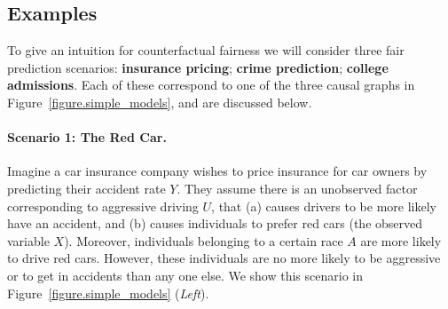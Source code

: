 \subsection{Examples}
To give an intuition for counterfactual fairness we will consider three %
fair prediction scenarios: \textbf{insurance pricing}; \textbf{crime prediction}; \textbf{college admissions}. Each of these correspond to one of the three causal graphs in Figure~\ref{figure.simple_models}, and are discussed below.
%
\paragraph{Scenario 1: The Red Car.}
Imagine a car insurance company wishes to price insurance for car owners by
predicting their accident rate $Y$. They assume there is an
unobserved factor corresponding to aggressive driving $U$, that (a) causes
drivers to be more likely have an accident, and (b) causes individuals to prefer red cars (the observed
variable $X$). Moreover, individuals belonging to a
certain race $A$ are more likely to drive red cars. However, these individuals are no more likely to be aggressive or to get in accidents than any one else. We show this scenario in Figure~\ref{figure.simple_models} (\emph{Left}).


